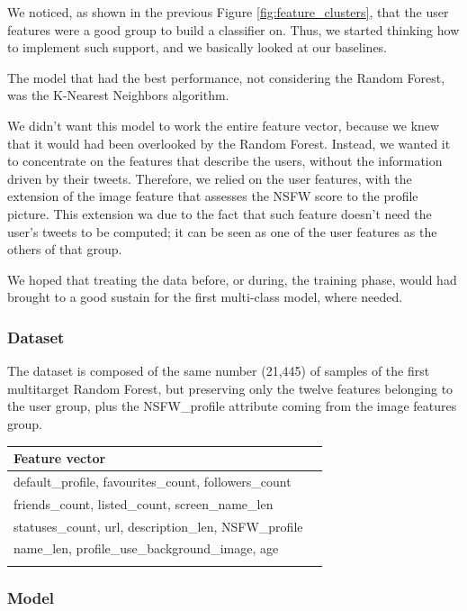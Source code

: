 We noticed, as shown in the previous Figure \ref{fig:feature_clusters}, that the user features were a good group to build a classifier on. Thus, we started thinking how to implement such support, and we basically looked at our baselines.

The model that had the best performance, not considering the Random Forest, was the K-Nearest Neighbors algorithm.

We didn't want this model to work the entire feature vector, because we knew that it would had been overlooked by the Random Forest. Instead, we wanted it to concentrate on the features that describe the users, without the information driven by their tweets. Therefore, we relied on the user features, with the extension of the image feature that assesses the NSFW score to the profile picture. This extension wa due to the fact that such feature doesn't need the user's tweets to be computed; it can be seen as one of the user features as the others of that group.

We hoped that treating the data before, or during, the training phase, would had brought to a good sustain for the first multi-class model, where needed.

\subsubsection{Dataset}
The dataset is composed of the same number (21,445) of samples of the first multitarget Random Forest, but preserving only the twelve features belonging to the user group, plus the NSFW\_profile attribute coming from the image features group.

\small
\begin{center}
	\begin{tabular}{ll}
		\\Feature vector\\
		\hline\hline
		default\_profile, favourites\_count, followers\_count\\
		friends\_count, listed\_count, screen\_name\_len\\
		statuses\_count, url, description\_len, NSFW\_profile\\
		name\_len, profile\_use\_background\_image, age\\\hline\\
	\end{tabular}
\end{center}
\normalsize

\subsubsection{Model}

